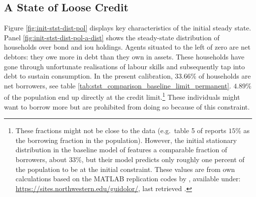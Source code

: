 \documentclass[a4paper,12pt]{article} %
\numberwithin{equation}{section} %
\numberwithin{figure}{section}
\numberwithin{table}{section}
\begin{document}
\subsection{A State of Loose Credit}
\label{sec:limit-stst-loose}

Figure \ref{fig:init-stst-dist-pol} displays key characteristics of the initial steady state. Panel \ref{fig:init-stst-dist-pol-a-dist} shows the steady-state distribution of households over bond and \Gls{iou} holdings. Agents situated to the left of zero are net debtors: they owe more in debt than they own in assets. These households have gone through unfortunate realisations of labour skills and subsequently tap into debt to sustain consumption. In the present calibration, $33.66\%$ of households are net borrowers, see table \ref{tab:stst_comparison_baseline_limit_permanent}. $4.89\%$ of the population end up directly at the credit limit.\footnote{These fractions might not be close to the data (e.g.~table 5 of \cite[p.~722]{kaplan2018} reports $15\%$ as the borrowing fraction in the population). However, the initial stationary distribution in the baseline model of \textcite{gl2017} features a comparable fraction of borrowers, about $33\%$, but their model predicts only roughly one percent of the population to be at the initial constraint. These values are from own calculations based on the MATLAB replication codes by \textcite{gl2017}, available under: \url{https://sites.northwestern.edu/guidolor/}, last retrieved .} These individuals might want to borrow more but are prohibited from doing so because of this constraint.
\end{document}
